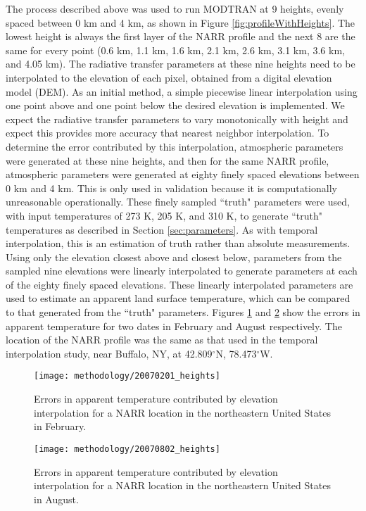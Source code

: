 \documentclass{book}
\begin{document}
The process described above was used to run MODTRAN at 9 heights, evenly spaced between 0 km and 4 km, as shown in Figure \ref{fig:profileWithHeights}.  The lowest height is always the first layer of the NARR profile and the next 8 are the same for every point (0.6 km, 1.1 km, 1.6 km, 2.1 km, 2.6 km, 3.1 km, 3.6 km, and 4.05 km).  The radiative transfer parameters at these nine heights need to be interpolated to the elevation of each pixel, obtained from a digital elevation model (DEM).  As an initial method, a simple piecewise linear interpolation using one point above and one point below the desired elevation is implemented.  We expect the radiative transfer parameters to vary monotonically with height and expect this provides more accuracy that nearest neighbor interpolation.  To determine the error contributed by this interpolation, atmospheric parameters were generated at these nine heights, and then for the same NARR profile, atmospheric parameters were generated at eighty finely spaced elevations between 0 km and 4 km.  This is only used in validation because it is computationally unreasonable operationally.  These finely sampled ``truth" parameters were used, with input temperatures of 273 K, 205 K, and 310 K, to generate ``truth" temperatures as described in Section \ref{sec:parameters}.  As with temporal interpolation, this is an estimation of truth rather than absolute measurements.  Using only the elevation closest above and closest below, parameters from the sampled nine elevations were linearly interpolated to generate parameters at each of the eighty finely spaced elevations.  These linearly interpolated parameters are used to estimate an apparent land surface temperature, which can be compared to that generated from the ``truth" parameters.  Figures \ref{fig:20070201_heights} and \ref{fig:20070802_heights} show the errors in apparent temperature for two dates in February and August respectively.  The location of the NARR profile was the same as that used in the temporal interpolation study, near Buffalo, NY, at 42.809$^\circ$N, 78.473$^\circ$W.

\begin{figure}[H]
\centering
\texttt{[image: methodology/20070201\_heights]}
\caption{Errors in apparent temperature contributed by elevation interpolation for a NARR location in the northeastern United States in February.}
\label{fig:20070201_heights}
\end{figure}

\begin{figure}[H]
\centering
\texttt{[image: methodology/20070802\_heights]}
\caption{Errors in apparent temperature contributed by elevation interpolation for a NARR location in the northeastern United States in August.}
\label{fig:20070802_heights}
\end{figure}
\end{document}
